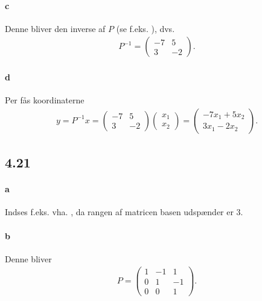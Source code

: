 			\paragraph{c} Denne bliver den inverse af $P$ (se f.eks. \cite[Eks. 4.4.13]{hesselholt2017}), dvs.
				\begin{align*}
					P^{-1}=\left(\begin{array}{rr} {-7} & {5} \\ {3} & {-2} \end{array}\right).
				\end{align*}

			\paragraph{d} Per \cite[Eks. 4.4.18]{hesselholt2017} fås koordinaterne 
				\begin{align*}
					y = P^{-1}x = \left(\begin{array}{rr} {-7} & {5} \\ {3} & {-2} \end{array}\right) \begin{pmatrix} x_1 \\ x_2 \end{pmatrix} = \begin{pmatrix} -7x_1 + 5x_2 \\ 3x_1 - 2x_2 \end{pmatrix}.
				\end{align*}

		\subsection{4.21}

			\paragraph{a} Indses f.eks. vha. \cite[Korollar 4.3.12]{hesselholt2017}, da rangen af matricen basen udspænder er $3$.

			\paragraph{b} Denne bliver 
				\begin{align*}
					P=\left(\begin{array}{rrr} {1} & {-1} & {1} \\ {0} & {1} & {-1} \\ {0} & {0} & {1} \end{array}\right).
				\end{align*}

